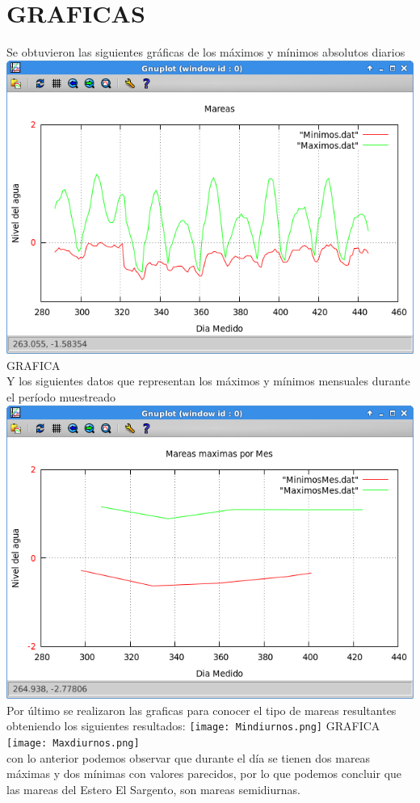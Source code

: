 \documentclass[letterpaper,10pt,twoside,onecolumn]{article}
\begin{document}
\section{GRAFICAS}
Se obtuvieron las siguientes gráficas de los máximos y mínimos absolutos diarios\\
\includegraphics[scale=.50]{MinimosyMaximos.png}
GRAFICA\\
Y los siguientes datos que representan los máximos y mínimos mensuales durante el período muestreado\\
\includegraphics[scale=.55]{MaxyMinMes.png}
Por último se realizaron las graficas para conocer el tipo de mareas resultantes
obteniendo los siguientes resultados:
\texttt{[image: Mindiurnos.png]}
GRAFICA\\
\texttt{[image: Maxdiurnos.png]}\\
con lo anterior podemos observar que durante el día se tienen dos mareas máximas y dos mínimas con valores parecidos, por lo que podemos concluir que las mareas del Estero El Sargento, son mareas semidiurnas.

\end{document}
